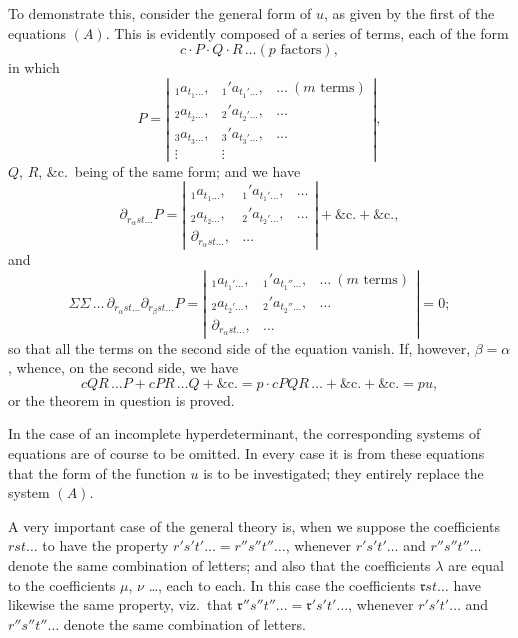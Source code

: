 \documentclass[11pt,a4paper]{article}
\theoremstyle{plain}
\theoremstyle{definition}
\theoremstyle{remark}
\begin{document}
To demonstrate this, consider the general form of $u$, as given by the first of the
equations $(A)$. This is evidently composed of a series of terms, each of the form
\[
c\cdot P\cdot Q\cdot R\,\ldots (p\text{ factors}),
\]
in which
\[
P = \left|
\begin{array}{ccc}
{}_1a_{t_1\ldots},& {}_1'a_{t_1'\ldots},&\ldots\ (m\text{ terms}) \\
{}_2a_{t_2\ldots},& {}_2'a_{t_2'\ldots},&\ldots \\
{}_3a_{t_3\ldots},& {}_3'a_{t_3'\ldots},&\ldots \\
\vdots&\vdots
\end{array}
\right|,
\]
$Q$, $R$, \&c.\ being of the same form; and we have
\[
\partial_{r_\alpha st\ldots} P =
\left|
\begin{array}{ccc}
{}_1a_{t_1\ldots},& {}_1'a_{t_1'\ldots},&\ldots \\
{}_2a_{t_2\ldots},& {}_2'a_{t_2'\ldots},&\ldots \\
\partial_{r_\alpha st\ldots},&\ldots
\end{array}
\right|
+\&\text{c.}+\&\text{c.},
\]
and
\[
\Sigma\Sigma\,\ldots\,\partial_{r_\alpha st\ldots}\partial_{r_\beta st\ldots} P =
\left|
\begin{array}{ccc}
{}_1a_{t_1'\ldots},& {}_1'a_{t_1''\ldots},&\ldots\ (m\text{ terms}) \\
{}_2a_{t_2'\ldots},& {}_2'a_{t_2''\ldots},&\ldots \\
\partial_{r_\alpha st\ldots},&\ldots
\end{array}
\right| = 0;
\]
so that all the terms on the second side of the equation vanish. If, however, $\beta=\alpha$,
whence, on the second side, we have
\[
cQR\,\ldots P + cPR\,\ldots Q + \&\text{c.}
= p\cdot cPQR\,\ldots + \&\text{c.}+\&\text{c.} = pu,
\]
or the theorem in question is proved.

In the case of an incomplete hyperdeterminant, the corresponding systems of
equations are of course to be omitted. In every case it is from these equations that
the form of the function $u$ is to be investigated; they entirely replace the system $(A)$.

A very important case of the general theory is, when we suppose the coefficients
$rst\ldots$ to have the property $r's't'\ldots=r''s''t''\ldots$, whenever $r's't'\ldots$ and $r''s''t''\ldots$ denote
the same combination of letters; and also that the coefficients $\lambda$ are equal to the
coefficients $\mu$, $\nu$ \ldots, each to each. In this case the coefficients $\mathfrak{r}st\ldots$ have likewise
the same property, viz.\ that $\mathfrak{r}''s''t''\ldots = \mathfrak{r}'s't'\ldots$, whenever $r's't'\ldots$ and $r''s''t''\ldots$ denote
the same combination of letters.
\end{document}
